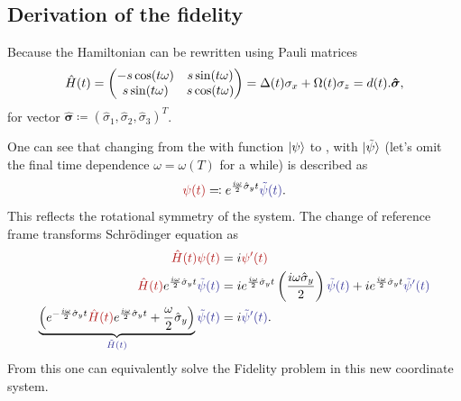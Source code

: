 \subsection{Derivation of the fidelity}
Because the Hamiltonian can be rewritten using Pauli matrices
\begin{equation}
    \hat{H}(t) = 
        \begin{pmatrix}
         -s \cos (t \omega ) & s \sin (t \omega ) \\
         s \sin (t \omega ) & s \cos (t \omega ) \\
        \end{pmatrix}
        =\Delta(t)\sigma_x+ \Omega(t)\sigma_z= d(t).\mathbf{\hat{\bm\sigma}},
\end{equation}
for vector $\hat{\bm\sigma}\coloneqq (\hat\sigma_1,\hat\sigma_2,\hat\sigma_3)^T$.

One can see that changing from the  with function $\ket{\psi}$ to , with $\ket{\tilde\psi}$ (let's omit the final time dependence $\omega=\omega(T)$ for a while) is described as
\begin{equation}
    \redd{\psi(t)} \eqqcolon \expsp \bluee{\tilde\psi(t)}.
\end{equation}
This reflects the rotational symmetry of the system. The change of reference frame transforms Schr\"odinger equation as
\begin{equation}
    \begin{split}
        \redd{\HH(t)\psi(t)} &= i\redd{\psi'(t)}\\
        \redd{\HH(t)} \expsp\bluee{\tilde\psi(t)} &= i \expsp \left(\frac{i\omega\hat\sigma_y}{2}\right)\bluee{\tilde\psi(t)}+i\expsp\bluee{\tilde\psi'(t)}\\
        \underbrace{\left(\expsm \redd{\HH(t)}\expsp+ \frac{\omega}{2}\hat\sigma_y\right)}_{\bluee{\tilde H(t)}}\bluee{\tilde\psi(t)}&=i\bluee{\tilde\psi'(t)}.
    \end{split}
\end{equation}
From this one can equivalently solve the Fidelity problem in this new coordinate system.

